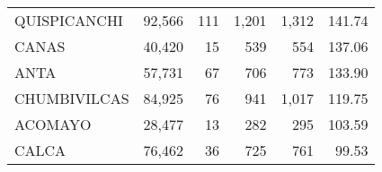 \begin{tabular}{lrrrrr}
	\cellcolor[HTML]{FFFC9E}QUISPICANCHI                                              & 92,566                                                         & 111                                                      & 1,201                                                    & 1,312                                                               & 141.74                                                                       \\
	\cellcolor[HTML]{FFFC9E}CANAS                                                     & 40,420                                                         & 15                                                       & 539                                                      & 554                                                                 & 137.06                                                                       \\
	\cellcolor[HTML]{FFFC9E}ANTA                                                      & 57,731                                                         & 67                                                       & 706                                                      & 773                                                                 & 133.90                                                                       \\
	\cellcolor[HTML]{9AFF99}CHUMBIVILCAS                                              & 84,925                                                         & 76                                                       & 941                                                      & 1,017                                                               & 119.75                                                                       \\
	\cellcolor[HTML]{9AFF99}ACOMAYO                                                   & 28,477                                                         & 13                                                       & 282                                                      & 295                                                                 & 103.59                                                                       \\
	\cellcolor[HTML]{9AFF99}CALCA                                                     & 76,462                                                         & 36                                                       & 725                                                      & 761                                                                 & 99.53                                                                        \\

\end{tabular}
